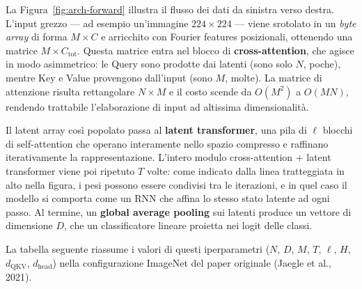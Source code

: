 \documentclass[
  11pt,
]{article}
\begin{document}
La Figura~\ref{fig:arch-forward} illustra il flusso dei dati da sinistra verso destra. L'input grezzo --- ad esempio un'immagine $224 \times 224$ --- viene srotolato in un \emph{byte array} di forma $M \times C$ e arricchito con Fourier features posizionali, ottenendo una matrice $M \times C_{\text{tot}}$. Questa matrice entra nel blocco di \textbf{cross-attention}, che agisce in modo asimmetrico: le Query sono prodotte dai latenti (sono solo $N$, poche), mentre Key e Value provengono dall'input (sono $M$, molte). La matrice di attenzione risulta rettangolare $N \times M$ e il costo scende da $O(M^2)$ a $O(MN)$, rendendo trattabile l'elaborazione di input ad altissima dimensionalità.

Il latent array così popolato passa al \textbf{latent transformer}, una pila di $\ell$ blocchi di self-attention che operano interamente nello spazio compresso e raffinano iterativamente la rappresentazione. L'intero modulo cross-attention + latent transformer viene poi ripetuto $T$ volte: come indicato dalla linea tratteggiata in alto nella figura, i pesi possono essere condivisi tra le iterazioni, e in quel caso il modello si comporta come un RNN che affina lo stesso stato latente ad ogni passo. Al termine, un \textbf{global average pooling} sui latenti produce un vettore di dimensione $D$, che un classificatore lineare proietta nei logit delle classi.

La tabella seguente riassume i valori di questi iperparametri ($N$, $D$, $M$, $T$, $\ell$, $H$, $d_{\text{QKV}}$, $d_{\text{head}}$) nella configurazione ImageNet del paper originale (Jaegle et al., 2021).
\end{document}
